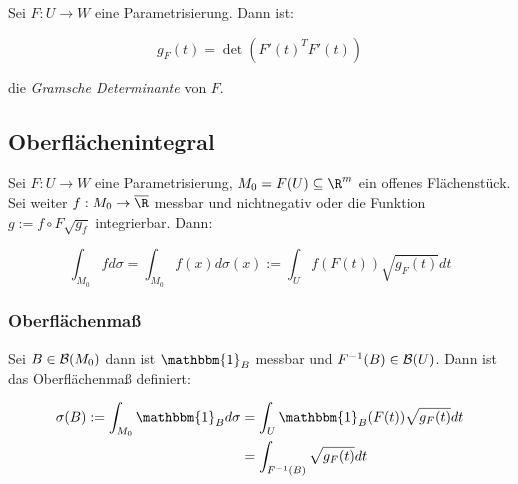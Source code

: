 Sei $F : U \to W$ eine Parametrisierung. Dann ist:

\vspace{-2mm}
$$g_F(t) = \det(F'(t)^TF'(t))$$

die \emph{Gramsche Determinante} von $F$.

\subsection*{Oberflächenintegral}

Sei $F : U \to W$ eine Parametrisierung, $M_0 = F(U) \subseteq \R^m$ ein offenes Flächenstück. Sei weiter $f : M_0 \to \overline\R$ messbar und nichtnegativ oder die Funktion $g := f \circ F \sqrt{g_f}$ integrierbar. Dann:

\vspace{-4mm}
$$\int_{M_0} f d\sigma = \int_{M_0} f(x) d\sigma(x) := \int_U f(F(t))\sqrt{g_F(t)} dt$$

\subsubsection*{Oberflächenmaß}

Sei $B \in \mathcal{B}(M_0)$ dann ist $\mathbbm{1}_B$ messbar und $F^{-1}(B) \in \mathcal{B}(U)$. Dann ist das Oberflächenmaß definiert:

\vspace{-4mm}
\begin{align*}
\sigma(B) := \int_{M_0} \mathbbm{1}_B d\sigma &= \int_U \mathbbm{1}_B(F(t)) \sqrt{g_F(t)} dt\\
                             &= \int_{F^{-1}(B)} \sqrt{g_F(t)} dt
\end{align*}
